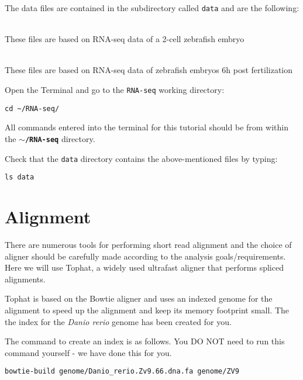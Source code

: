 The data files are contained in the subdirectory called \texttt{data} and are
the following:
\begin{description}[style=multiline,labelindent=1.5cm,align=left,leftmargin=2.5cm]
  \item[\texttt{2cells\_1.fastq} and \texttt{2cells\_2.fastq}] \hfill\\
 These files are based on RNA-seq data of a 2-cell zebrafish embryo
  \item[\texttt{6h\_1.fastq} and \texttt{6h\_2.fastq}] \hfill\\
 These files are based on RNA-seq data of zebrafish embryos 6h post
 fertilization
\end{description}

\begin{steps}
Open the Terminal and go to the \texttt{RNA-seq} working directory:
\begin{lstlisting}
cd ~/RNA-seq/
\end{lstlisting}
\end{steps}

\begin{warning}
  All commands entered into the terminal for this tutorial should be from within the
  \textbf{\texttt{$\sim$/RNA-seq}} directory.
\end{warning}

\begin{steps}
Check that the \texttt{data} directory contains the above-mentioned files by typing:
\begin{lstlisting}
ls data
\end{lstlisting}
\end{steps}

\section{Alignment}
There are numerous tools for performing short read alignment and the choice of aligner
should be carefully made according to the analysis goals/requirements. Here we will
use Tophat, a widely used ultrafast aligner that performs spliced alignments.

Tophat is based on the Bowtie aligner and uses an indexed genome for the
alignment to speed up the alignment and keep its memory footprint small. 
The the index for the \textit{Danio rerio} genome has been created for you. 

\begin{warning}
The command to create an index is as follows. You DO NOT need to run this command
yourself - we have done this for you.
\begin{lstlisting}
bowtie-build genome/Danio_rerio.Zv9.66.dna.fa genome/ZV9
\end{lstlisting}
\end{warning}

